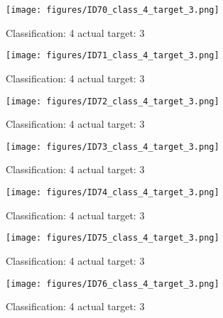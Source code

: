 \begin{figure}[h!]
\begin{center}
\texttt{[image: figures/ID70\_class\_4\_target\_3.png]}
\end{center}
\caption{ Classification: 4 actual target: 3}
\label{fig:ID70_class_4_target_3}
\end{figure}
\begin{figure}[h!]
\begin{center}
\texttt{[image: figures/ID71\_class\_4\_target\_3.png]}
\end{center}
\caption{ Classification: 4 actual target: 3}
\label{fig:ID71_class_4_target_3}
\end{figure}
\begin{figure}[h!]
\begin{center}
\texttt{[image: figures/ID72\_class\_4\_target\_3.png]}
\end{center}
\caption{ Classification: 4 actual target: 3}
\label{fig:ID72_class_4_target_3}
\end{figure}
\begin{figure}[h!]
\begin{center}
\texttt{[image: figures/ID73\_class\_4\_target\_3.png]}
\end{center}
\caption{ Classification: 4 actual target: 3}
\label{fig:ID73_class_4_target_3}
\end{figure}
\begin{figure}[h!]
\begin{center}
\texttt{[image: figures/ID74\_class\_4\_target\_3.png]}
\end{center}
\caption{ Classification: 4 actual target: 3}
\label{fig:ID74_class_4_target_3}
\end{figure}
\begin{figure}[h!]
\begin{center}
\texttt{[image: figures/ID75\_class\_4\_target\_3.png]}
\end{center}
\caption{ Classification: 4 actual target: 3}
\label{fig:ID75_class_4_target_3}
\end{figure}
\begin{figure}[h!]
\begin{center}
\texttt{[image: figures/ID76\_class\_4\_target\_3.png]}
\end{center}
\caption{ Classification: 4 actual target: 3}
\label{fig:ID76_class_4_target_3}
\end{figure}

